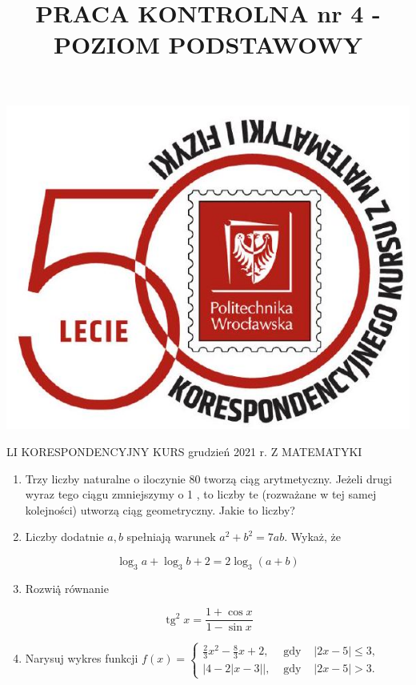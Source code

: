 \documentclass[10pt]{article}
\title{PRACA KONTROLNA nr 4 - POZIOM PODSTAWOWY }
\author{}
\date{}
\begin{document}
\maketitle
\begin{center}
\includegraphics[max width=\textwidth]{2024_11_16_19f402d884a8e01da46ag-1}
\end{center}

LI KORESPONDENCYJNY KURS grudzień 2021 r. Z MATEMATYKI

\begin{enumerate}
  \item Trzy liczby naturalne o iloczynie 80 tworzą ciąg arytmetyczny. Jeżeli drugi wyraz tego ciągu zmniejszymy o 1 , to liczby te (rozważane w tej samej kolejności) utworzą ciąg geometryczny. Jakie to liczby?
  \item Liczby dodatnie $a, b$ spełniają warunek $a^{2}+b^{2}=7 a b$. Wykaż, że
\end{enumerate}

$$
\log _{3} a+\log _{3} b+2=2 \log _{3}(a+b)
$$

\begin{enumerate}
  \setcounter{enumi}{2}
  \item Rozwią̇̇ równanie
\end{enumerate}

$$
\operatorname{tg}^{2} x=\frac{1+\cos x}{1-\sin x}
$$

\begin{enumerate}
  \setcounter{enumi}{3}
  \item Narysuj wykres funkcji $f(x)=\left\{\begin{array}{lll}\frac{2}{3} x^{2}-\frac{8}{3} x+2, & \text { gdy } & |2 x-5| \leqslant 3, \\ |4-2| x-3| |, & \text { gdy } & |2 x-5|>3 .\end{array}\right.$
\end{enumerate}
\end{document}
